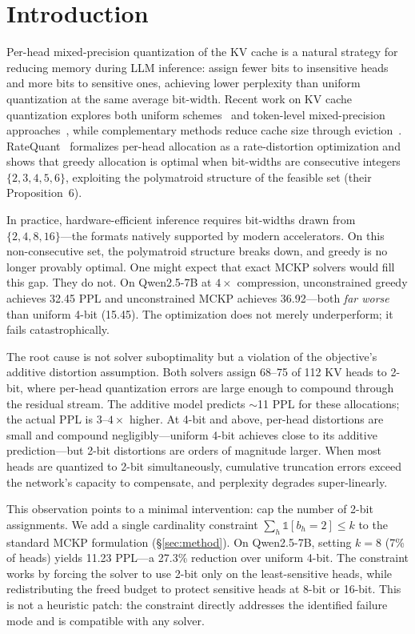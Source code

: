 \section{Introduction}
\label{sec:introduction}

Per-head mixed-precision quantization of the KV cache is a natural strategy for reducing memory during LLM inference: assign fewer bits to insensitive heads and more bits to sensitive ones, achieving lower perplexity than uniform quantization at the same average bit-width.
Recent work on KV cache quantization explores both uniform schemes~\cite{liu2024kivi,hooper2024kvquant,lin2024qserve,he2024zipcache} and token-level mixed-precision approaches~\cite{ge2024fastgen,lei2026arkv}, while complementary methods reduce cache size through eviction~\cite{zhang2023h2o,li2024snapkv}.
RateQuant~\cite{zuo2026ratequant} formalizes per-head allocation as a rate-distortion optimization and shows that greedy allocation is optimal when bit-widths are consecutive integers $\{2,3,4,5,6\}$, exploiting the polymatroid structure of the feasible set (their Proposition~6).

In practice, hardware-efficient inference requires bit-widths drawn from $\{2, 4, 8, 16\}$---the formats natively supported by modern accelerators.
On this non-consecutive set, the polymatroid structure breaks down, and greedy is no longer provably optimal.
One might expect that exact MCKP solvers would fill this gap.
They do not.
On Qwen2.5-7B at $4\times$ compression, unconstrained greedy achieves 32.45 PPL and unconstrained MCKP achieves 36.92---both \emph{far worse} than uniform 4-bit (15.45).
The optimization does not merely underperform; it fails catastrophically.

The root cause is not solver suboptimality but a violation of the objective's additive distortion assumption.
Both solvers assign 68--75 of 112 KV heads to 2-bit, where per-head quantization errors are large enough to compound through the residual stream.
The additive model predicts $\sim$11 PPL for these allocations; the actual PPL is $3$--$4\times$ higher.
At 4-bit and above, per-head distortions are small and compound negligibly---uniform 4-bit achieves close to its additive prediction---but 2-bit distortions are orders of magnitude larger.
When most heads are quantized to 2-bit simultaneously, cumulative truncation errors exceed the network's capacity to compensate, and perplexity degrades super-linearly.

This observation points to a minimal intervention: cap the number of 2-bit assignments.
We add a single cardinality constraint $\sum_h \mathbb{1}[b_h{=}2] \leq k$ to the standard MCKP formulation (\S\ref{sec:method}).
On Qwen2.5-7B, setting $k{=}8$ (7\% of heads) yields 11.23 PPL---a 27.3\% reduction over uniform 4-bit.
The constraint works by forcing the solver to use 2-bit only on the least-sensitive heads, while redistributing the freed budget to protect sensitive heads at 8-bit or 16-bit.
This is not a heuristic patch: the constraint directly addresses the identified failure mode and is compatible with any solver.

